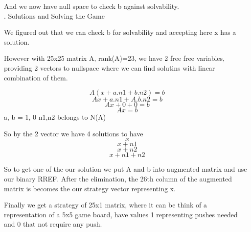 \documentclass[]{article}
\begin{document}
And we now have null space to check b against solvability. \\



. Solutions and Solving the Game


We figured out that we can check b for solvability and accepting here x has a solution.

However with 25x25 matrix A, rank(A)=23, we have 2 free free variables, providing 2 vectors to nullspace where we can find solutins with linear combination of them.

$$A(x + a.n1 + b.n2) = b$$
$$Ax + a.n1 + A.b.n2 = b$$
$$Ax + 0 + 0 = b$$
$$Ax = b$$
a, b = 1, 0 n1,n2 belongs to N(A)

So by the 2 vector we have 4 solutions to have
$$x$$
$$x + n1 $$
$$x + n2 $$
$$x + n1 +n2$$

So to get one of the our solution we put A and b into augmented matrix and use our binary RREF. After the elimination, the 26th column of the augmented matrix is becomes the our strategy vector representing x.

Finally we get a strategy of 25x1 matrix, where it can be think of a representation of a 5x5 game board, have values 1 representing pushes needed and 0 that not require any push.
\end{document}
